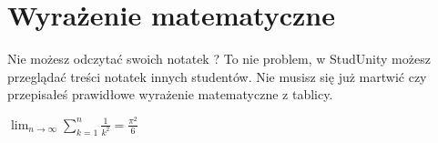 \section{Wyrażenie matematyczne }

\noindent Nie możesz odczytać swoich notatek ? To nie problem, w StudUnity możesz przeglądać treści notatek innych studentów. Nie musisz się już martwić czy przepisałeś prawidłowe wyrażenie matematyczne z tablicy.


 $\lim_{n \to \infty}
\sum_{k=1}^n \frac{1}{k^2}
= \frac{\pi^2}{6}$